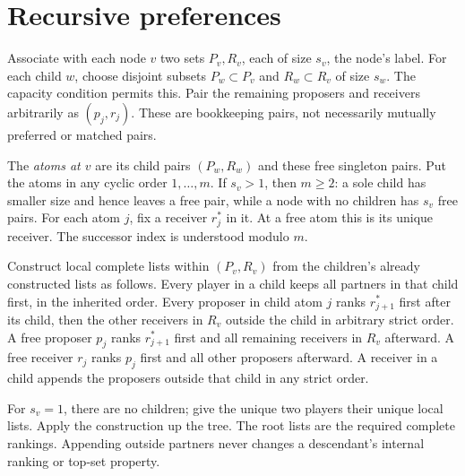 \documentclass[11pt]{article}
\theoremstyle{definition}
\begin{document}
\section*{Recursive preferences}
Associate with each node $v$ two sets $P_v,R_v$, each of size $s_v$,
the node's label. For each child $w$, choose disjoint subsets
$P_w\subset P_v$ and $R_w\subset R_v$ of size $s_w$. The capacity
condition permits this. Pair the remaining proposers and receivers
arbitrarily as $(p_j,r_j)$. These are bookkeeping pairs, not necessarily
mutually preferred or matched pairs.

The \emph{atoms at $v$} are its child pairs $(P_w,R_w)$ and these free
singleton pairs. Put the atoms in any cyclic order $1,\ldots,m$. If
$s_v>1$, then $m\ge2$: a sole child has smaller size and hence leaves
a free pair, while a node with no children has $s_v$ free pairs. For
each atom $j$, fix a receiver $r_j^*$ in it. At a free atom this is its
unique receiver. The successor index is understood modulo $m$.

Construct local complete lists within $(P_v,R_v)$ from the children's
already constructed lists as follows. Every player in a child keeps
all partners in that child first, in the inherited order. Every
proposer in child atom $j$ ranks $r_{j+1}^*$ first after its child,
then the other receivers in $R_v$ outside the child in arbitrary
strict order. A free proposer $p_j$ ranks $r_{j+1}^*$ first and all
remaining receivers in $R_v$ afterward. A free receiver $r_j$ ranks
$p_j$ first and all other proposers afterward. A receiver in a child
appends the proposers outside that child in any strict order.

For $s_v=1$, there are no children; give the unique two players their
unique local lists. Apply the construction up the tree. The root
lists are the required complete rankings. Appending outside partners
never changes a descendant's internal ranking or top-set property.
\end{document}
